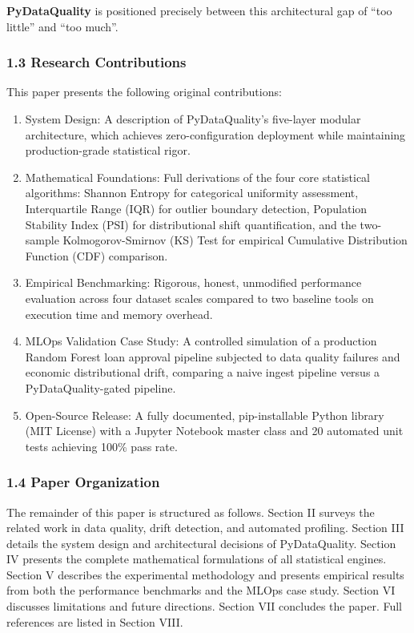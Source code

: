 \documentclass{article}
\begin{document}
\textbf{PyDataQuality} is positioned precisely between this
architectural gap of ``too little'' and ``too much''.

\subsubsection{1.3 Research Contributions}\label{research-contributions}

This paper presents the following original contributions:

\begin{enumerate}
\def\labelenumi{\arabic{enumi}.}
\item
  System Design: A description of PyDataQuality's five-layer modular
  architecture, which achieves zero-configuration deployment while
  maintaining production-grade statistical rigor.
\item
  Mathematical Foundations: Full derivations of the four core
  statistical algorithms: Shannon Entropy for categorical uniformity
  assessment, Interquartile Range (IQR) for outlier boundary detection,
  Population Stability Index (PSI) for distributional shift
  quantification, and the two-sample Kolmogorov-Smirnov (KS) Test for
  empirical Cumulative Distribution Function (CDF) comparison.
\item
  Empirical Benchmarking: Rigorous, honest, unmodified performance
  evaluation across four dataset scales compared to two baseline tools
  on execution time and memory overhead.
\item
  MLOps Validation Case Study: A controlled simulation of a production
  Random Forest loan approval pipeline subjected to data quality
  failures and economic distributional drift, comparing a naive ingest
  pipeline versus a PyDataQuality-gated pipeline.
\item
  Open-Source Release: A fully documented, pip-installable Python
  library (MIT License) with a Jupyter Notebook master class and 20
  automated unit tests achieving 100\% pass rate.
\end{enumerate}

\subsubsection{1.4 Paper Organization}\label{paper-organization}

The remainder of this paper is structured as follows. Section II surveys
the related work in data quality, drift detection, and automated
profiling. Section III details the system design and architectural
decisions of PyDataQuality. Section IV presents the complete
mathematical formulations of all statistical engines. Section V
describes the experimental methodology and presents empirical results
from both the performance benchmarks and the MLOps case study. Section
VI discusses limitations and future directions. Section VII concludes
the paper. Full references are listed in Section VIII.
\end{document}
